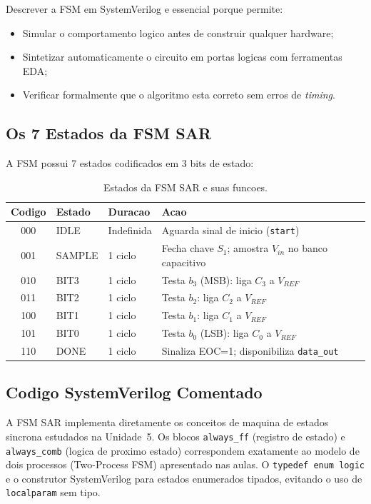 \documentclass[12pt, a4paper]{article}
\begin{document}
Descrever a FSM em SystemVerilog e essencial porque permite:
\begin{itemize}
  \item Simular o comportamento logico antes de construir qualquer hardware;
  \item Sintetizar automaticamente o circuito em portas logicas com ferramentas EDA;
  \item Verificar formalmente que o algoritmo esta correto sem erros de \textit{timing}.
\end{itemize}

\subsection{Os 7 Estados da FSM SAR}

A FSM possui 7 estados codificados em 3 bits de estado:

\begin{table}[H]
\centering
\caption{Estados da FSM SAR e suas funcoes.}
\label{tab:estados}
\begin{tabular}{clll}
\toprule
\textbf{Codigo} & \textbf{Estado} & \textbf{Duracao} & \textbf{Acao}\\
\midrule
000 & IDLE   & Indefinida & Aguarda sinal de inicio (\texttt{start}) \\
001 & SAMPLE & 1 ciclo    & Fecha chave $S_1$; amostra $V_{in}$ no banco capacitivo \\
010 & BIT3   & 1 ciclo    & Testa $b_3$ (MSB): liga $C_3$ a $V_{REF}$ \\
011 & BIT2   & 1 ciclo    & Testa $b_2$: liga $C_2$ a $V_{REF}$ \\
100 & BIT1   & 1 ciclo    & Testa $b_1$: liga $C_1$ a $V_{REF}$ \\
101 & BIT0   & 1 ciclo    & Testa $b_0$ (LSB): liga $C_0$ a $V_{REF}$ \\
110 & DONE   & 1 ciclo    & Sinaliza EOC=1; disponibiliza \texttt{data\_out} \\
\bottomrule
\end{tabular}
\end{table}

\subsection{Codigo SystemVerilog Comentado}

\begin{unidadebox}
A FSM SAR implementa diretamente os conceitos de maquina de estados sincrona estudados na
Unidade~5. Os blocos \texttt{always\_ff} (registro de estado) e \texttt{always\_comb}
(logica de proximo estado) correspondem exatamente ao modelo de dois processos (Two-Process
FSM) apresentado nas aulas. O \texttt{typedef enum logic} e o construtor SystemVerilog
para estados enumerados tipados, evitando o uso de \texttt{localparam} sem tipo.
\end{unidadebox}
\end{document}
